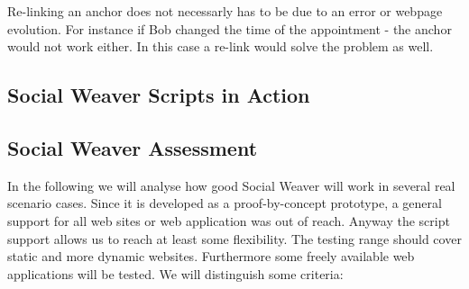 Re-linking an anchor does not necessarly has to be due to an error or webpage evolution. For instance if Bob changed the time of the appointment - the anchor would not work either. In this case a re-link would solve the problem as well.

\newpage
\subsection{Social Weaver Scripts in Action}

\newpage
\subsection{Social Weaver Assessment}\label{sowe-assessment}
In the following we will analyse how good Social Weaver will work in several real scenario cases. Since it is developed as a proof-by-concept prototype, a general support for all web sites or web application was out of reach. Anyway the script support allows us to reach at least some flexibility. The testing range should cover static and more dynamic websites. Furthermore some freely available web applications will be tested. We will distinguish some criteria:
